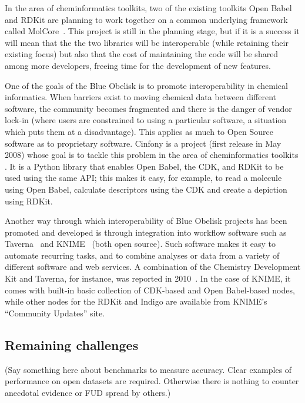 \documentclass[10pt]{bmc_article}
\newenvironment{bmcformat}{\fussy\setboolean{publ}{true}}{\fussy}
\begin{document}
\begin{bmcformat}
In the area of cheminformatics toolkits, two of the existing toolkits
Open Babel and RDKit are planning to work together on a common
underlying framework called MolCore~\cite{WebMolCore}. This project is still in the
planning stage, but if it is a success it will mean that the the two
libraries will be interoperable (while retaining their existing focus)
but also that the cost of maintaining the code will be shared among
more developers, freeing time for the development of new features.

One of the goals of the Blue Obelisk is to promote interoperability in chemical
informatics. When barriers exist to moving chemical data between
different software, the community becomes fragmented and there is
the danger of vendor lock-in (where users are constrained to using
a particular software, a situation which puts them at a
disadvantage). This applies as much to Open Source software as to
proprietary software. Cinfony is a project (first release in May 2008)
whose goal is to tackle this problem in the area of cheminformatics
toolkits \cite{OBoyleCinfony2008}.
It is a Python library that enables Open Babel, the CDK, and RDKit to
be used using the same API; this makes it easy, for example, to read a
molecule using Open Babel, calculate descriptors using the CDK and
create a depiction using RDKit.

Another way through which interoperability of Blue Obelisk projects
has been promoted and developed is through integration into
workflow software such as Taverna~\cite{Hull:2006p60} and
KNIME~\cite{WebKNIME} (both open source).
Such software makes it easy to automate recurring
tasks, and to combine analyses or data from a variety of different software
and web services.
A combination of the Chemistry Development Kit and Taverna, for instance, was
reported in 2010~\cite{Kuhn:2010p4001}. 
In the case of KNIME, it comes with built-in basic collection of CDK-based and
Open Babel-based nodes, while other nodes for the RDKit and Indigo are
available from KNIME's ``Community Updates'' site.

  \subsection*{Remaining challenges}

(Say something here about benchmarks to measure accuracy. Clear examples
 of performance on open datasets are required. Otherwise there is
 nothing to counter anecdotal evidence or FUD spread by others.)


\end{bmcformat}
\end{document}
